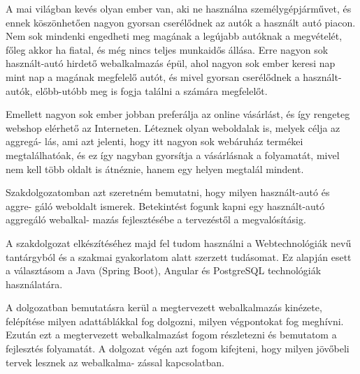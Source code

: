 
A mai világban kevés olyan ember van, aki ne használna személygépjárművet, és ennek köszönhetően nagyon gyorsan cserélődnek az autók a használt autó piacon. Nem sok mindenki engedheti meg magának a legújabb autóknak a megvételét, főleg akkor ha fiatal, és még nincs teljes munkaidős állása. Erre nagyon sok használt-autó hirdető webalkalmazás épül, ahol nagyon sok ember keresi nap mint nap a magának megfelelő autót, és mivel gyorsan cserélődnek a használt-autók, előbb-utóbb meg is fogja találni a számára megfelelőt.

Emellett nagyon sok ember jobban preferálja az online vásárlást, és így rengeteg webshop elérhető az Interneten. Léteznek olyan weboldalak is, melyek célja az aggregá-
lás, ami azt jelenti, hogy itt nagyon sok webáruház termékei megtalálhatóak, és ez így nagyban gyorsítja a vásárlásnak a folyamatát, mivel nem kell több oldalt is átnéznie, hanem egy helyen megtalál mindent.

Szakdolgozatomban azt szeretném bemutatni, hogy milyen használt-autó és aggre-
gáló weboldalt ismerek. Betekintést fogunk kapni egy használt-autó aggregáló webalkal-
mazás fejlesztésébe a tervezéstől a megvalósításig. 

A szakdolgozat elkészítéséhez majd fel tudom használni a Webtechnológiák nevű tantárgyból és a szakmai gyakorlatom alatt szerzett tudásomat. Ez alapján esett a választásom a Java (Spring Boot), Angular és PostgreSQL technológiák használatára.

A dolgozatban bemutatásra kerül a megtervezett webalkalmazás kinézete, felépítése milyen adattáblákkal fog dolgozni, milyen végpontokat fog meghívni. Ezután ezt a megtervezett webalkalmazást fogom részletezni és bemutatom a fejlesztés folyamatát.  A dolgozat végén azt fogom kifejteni, hogy milyen jövőbeli tervek lesznek az webalkalma-
zással kapcsolatban.